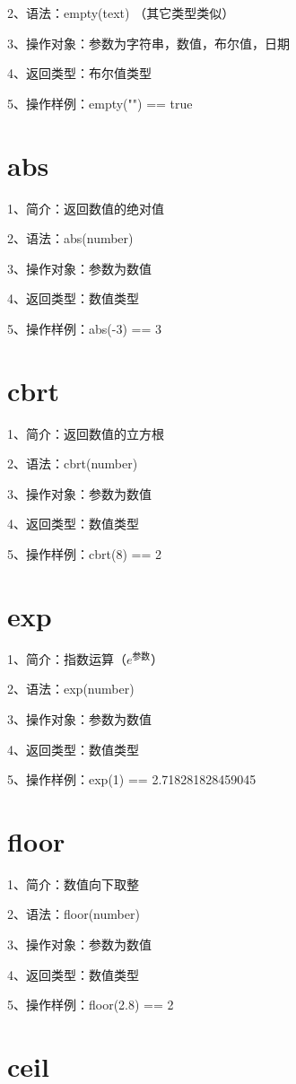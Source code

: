 2、语法：empty(text) （其它类型类似）

3、操作对象：参数为字符串，数值，布尔值，日期

4、返回类型：布尔值类型

5、操作样例：empty("") == true

\section{abs}

1、简介：返回数值的绝对值

2、语法：abs(number)

3、操作对象：参数为数值

4、返回类型：数值类型

5、操作样例：abs(-3) == 3

\section{cbrt}

1、简介：返回数值的立方根

2、语法：cbrt(number)

3、操作对象：参数为数值

4、返回类型：数值类型

5、操作样例：cbrt(8) == 2

\section{exp}

1、简介：指数运算（$e^{\text{参数}}$）

2、语法：exp(number)

3、操作对象：参数为数值

4、返回类型：数值类型

5、操作样例：exp(1) == 2.718281828459045

\section{floor}

1、简介：数值向下取整

2、语法：floor(number)

3、操作对象：参数为数值

4、返回类型：数值类型

5、操作样例：floor(2.8) == 2

\section{ceil}

